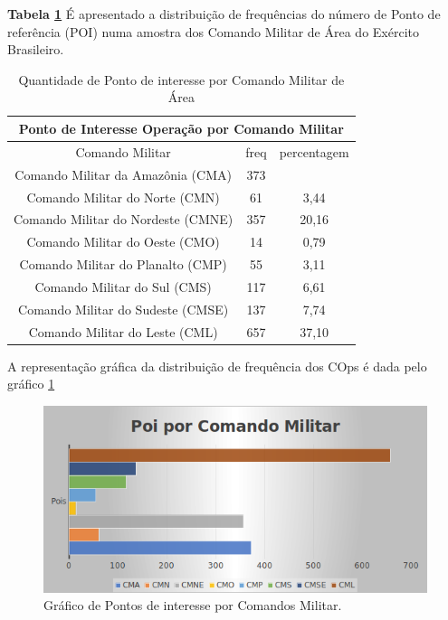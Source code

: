 \textbf{Tabela \ref{QuantidadePois}} É apresentado a distribuição de frequências do número de Ponto de referência (POI) numa amostra dos Comando Militar de Área do Exército Brasileiro. 
\begin{table}[H]
\centering
\begin{tabular}{|c | c| c|} 
 \multicolumn{3}{c}{Ponto de Interesse Operação por Comando Militar}\\ \hline
  Comando Militar & freq  & percentagem  \\ [0.5ex] 
 \hline
 Comando Militar da Amazônia (CMA) &  373 & \\ 
 \hline
 Comando Militar do Norte (CMN) &  61 & 3,44\\
 \hline
 Comando Militar do Nordeste (CMNE) &  357 & 20,16\\
 \hline
 Comando Militar do Oeste (CMO) &  14 & 0,79\\
 \hline
 Comando Militar do Planalto (CMP) &  55 & 3,11\\
 \hline
 Comando Militar do Sul (CMS) &  117 & 6,61\\
 \hline
 Comando Militar do Sudeste (CMSE) &  137 & 7,74\\
 \hline
 Comando Militar do Leste (CML) &  657 & 37,10\\ [1ex] 
 \hline
\end{tabular}
\caption{Quantidade de Ponto de interesse por Comando Militar de Área}
\label{QuantidadePois}
\end{table}

A representação gráfica da distribuição de frequência dos COps é dada pelo gráfico \ref{figuraPois}
\begin{figure}[H]
        \centering
        \includegraphics[width=1\textwidth]{Figuras/qtde_pois.png}
        \caption{Gráfico de Pontos de interesse por Comandos Militar.}
        \label{figuraPois}
\end{figure}

